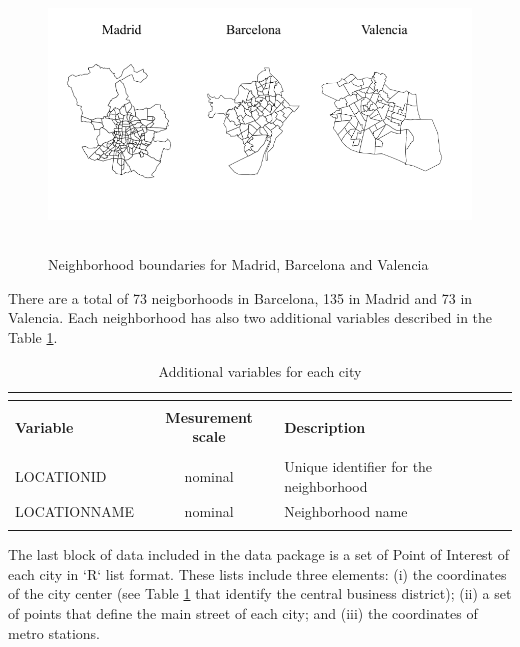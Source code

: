 \documentclass[times,final]{elsarticle}
\begin{document}
\begin{figure}[h]
  \caption{Neighborhood boundaries for Madrid, Barcelona and Valencia}
  \centering
  \includegraphics[height=6.5cm]{figures/idealista18-all-polygons}
  \label{fig:all-polygons}
\end{figure}

There are a total of 73 neigborhoods in Barcelona, 135 in Madrid and 73 in Valencia. Each neighborhood has also two additional variables described in the Table \ref{table:data-additional-variables}.

\begin{footnotesize}
\begin{longtable}{p{40mm} c p{63mm}}
\caption{Additional variables for each city} \\
\label{table:data-additional-variables} \\
\hline
\hline
& &\\
\textbf{Variable} & \textbf{Mesurement scale} & \textbf{Description}\\
\hline
& &\\
LOCATIONID & nominal & Unique identifier for the neighborhood \\
LOCATIONNAME & nominal & Neighborhood name \\
& &\\
\hline
\end{longtable}
\end{footnotesize}

The last block of data included in the data package is a set of Point of Interest of each city in `R` list format. These lists include three elements: (i) the coordinates of the city center (see Table \ref{table:data-additional-variables} that identify the central business district); (ii) a set of points that define the main street of each city; and (iii) the coordinates of metro stations.
\end{document}
